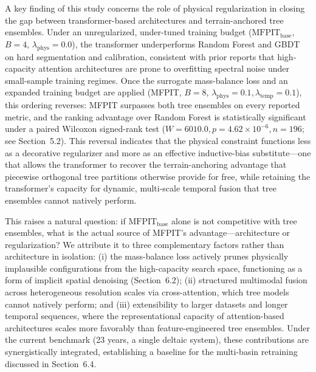 \documentclass[preprint,12pt]{elsarticle}
\begin{document}
A key finding of this study concerns the role of physical regularization in closing the gap between transformer-based architectures and terrain-anchored tree ensembles. Under an unregularized, under-tuned training budget ($\text{MFPIT}_{\text{base}}$, $B=4$, $\lambda_{\text{phys}} = 0.0$), the transformer underperforms Random Forest and GBDT on hard segmentation and calibration, consistent with prior reports that high-capacity attention architectures are prone to overfitting spectral noise under small-sample training regimes. Once the surrogate mass-balance loss and an expanded training budget are applied (MFPIT, $B=8$, $\lambda_{\text{phys}} = 0.1, \lambda_{\text{temp}} = 0.1$), this ordering reverses: MFPIT surpasses both tree ensembles on every reported metric, and the ranking advantage over Random Forest is statistically significant under a paired Wilcoxon signed-rank test ($W = 6010.0, p = 4.62 \times 10^{-6}, n = 196$; see Section~5.2). This reversal indicates that the physical constraint functions less as a decorative regularizer and more as an effective inductive-bias substitute---one that allows the transformer to recover the terrain-anchoring advantage that piecewise orthogonal tree partitions otherwise provide for free, while retaining the transformer's capacity for dynamic, multi-scale temporal fusion that tree ensembles cannot natively perform.

This raises a natural question: if $\text{MFPIT}_{\text{base}}$ alone is not competitive with tree ensembles, what is the actual source of MFPIT's advantage---architecture or regularization? We attribute it to three complementary factors rather than architecture in isolation: (i) the mass-balance loss actively prunes physically implausible configurations from the high-capacity search space, functioning as a form of implicit spatial denoising (Section~6.2); (ii) structured multimodal fusion across heterogeneous resolution scales via cross-attention, which tree models cannot natively perform; and (iii) extensibility to larger datasets and longer temporal sequences, where the representational capacity of attention-based architectures scales more favorably than feature-engineered tree ensembles. Under the current benchmark (23 years, a single deltaic system), these contributions are synergistically integrated, establishing a baseline for the multi-basin retraining discussed in Section~6.4.
\end{document}
